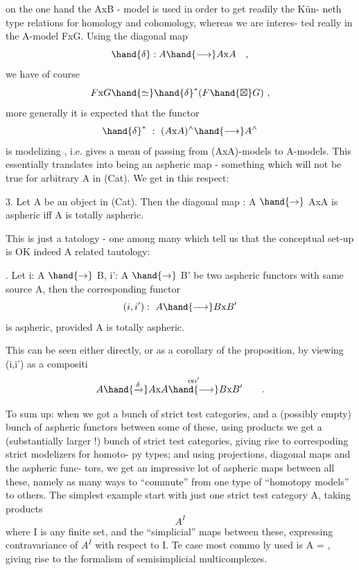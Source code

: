 
on the one hand the AxB - model is used in order to get readily the Kün-%
neth type relations for homology and cohomology, whereas we are interes-%
ted really in the A-model FxG. Using the diagonal map
\[ \hand{\delta} : A \hand{\longrightarrow} A\mathrm{x}A \quad , \]
we have of course
\[ F\mathrm{x}G \hand{\simeq} \hand{\delta}^{*}(F\hand{\boxtimes} G) \ , \]
more generally it is expected that the functor
\[ \hand{\delta}^{*} \ : \ (A\mathrm{x}A)^{\wedge} \hand{\longrightarrow} A^{\wedge} \]
is modelizing , i.e. gives a mean of passing from (AxA)-models to
A-models. This essentially translates into \hand{$\delta$} being an aspheric map -
something which will not be true for arbitrary A in (Cat). We get in
this respect:

\hand{\uline{\textcolor{black}{Proposition}}} 3. Let A be an object in (Cat). Then the diagonal map
 \hand{$\delta$} : A $\hand{\to}$ AxA is aspheric iff A is totally aspheric.

This is just a tatology - one among many which tell us that the
conceptual set-up is OK indeed A related tautology:

\hand{\uline{\textcolor{black}{Corollary}}}. Let i: A $\hand{\to}$ B, i': A $\hand{\to}$ B' be two aspheric functors with
same source A, then the corresponding functor
\[ (i,i') : \ A \hand{\longrightarrow} B\mathrm{x}B' \]
is aspheric, provided A is totally aspheric.

This can be seen either directly, or as a corollary of the
proposition, by viewing (i,i') as a compositi
\[ A \hand{\xrightarrow{\delta}} A\mathrm{x}A \overset{i\mathrm{x}i'}{\hand{\longrightarrow}} B\mathrm{x}B' \qquad . \]

To sum up: when we got a bunch of strict test categories, and
a (possibly empty) bunch of aspheric functors between some of these,
using  products we get a (substantially larger !) bunch of strict test
categories, giving rise to correspoding strict modelizers for homoto-%
py types; and using projections, diagonal maps\hand{,} and the  aspheric func-%
tors, we get an impressive lot of aspheric maps between all these,
namely as many ways to ``commute'' from one type of ``homotopy models'' to
others. The simplest example\hand{:}  start with just one strict test
category A, taking products
\[ A^{I} \]
where I is any finite set, and the ``simplicial'' maps between these,
expressing contravariance of $A^{I}$ with respect to I. Te case most commo%
ly used is A = \hand{$\Delta$}, giving rise to the formalism of semisimplicial
multicomplexes.

